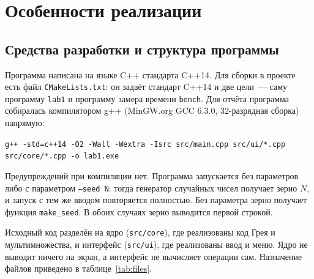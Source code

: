 \documentclass[14pt,a4paper]{extarticle}
\newcommand{\code}[1]{\texttt{#1}}
\newcommand{\us}{\_\allowbreak{}}
\begin{document}
\section{Особенности реализации}

\subsection{Средства разработки и структура программы}

Программа написана на языке C++ стандарта C++14. Для сборки в проекте есть файл \code{CMakeLists.txt}: он задаёт стандарт C++14 и две цели~--- саму программу \code{lab1} и программу замера времени \code{bench}. Для отчёта программа собиралась компилятором g++ (MinGW.org GCC 6.3.0, 32-разрядная сборка) напрямую:
\begin{center}
\code{g++ -std=c++14 -O2 -Wall -Wextra -Isrc src/main.cpp src/ui/*.cpp src/core/*.cpp -o lab1.exe}
\end{center}
Предупреждений при компиляции нет. Программа запускается без параметров либо с параметром \code{--seed N}: тогда генератор случайных чисел получает зерно $N$, и запуск с тем же вводом повторяется полностью. Без параметра зерно получает функция \code{make\us{}seed}. В обоих случаях зерно выводится первой строкой.

Исходный код разделён на ядро (\code{src/core}), где реализованы код Грея и мультимножества, и интерфейс (\code{src/ui}), где реализованы ввод и меню. Ядро не выводит ничего на экран, а интерфейс не вычисляет операции сам. Назначение файлов приведено в таблице~\ref{tab:files}.
\end{document}
